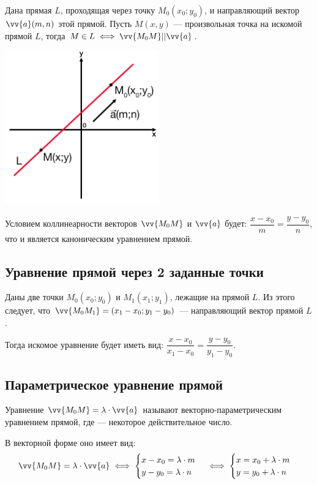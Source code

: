 \documentclass[a4paper,12pt]{extbook}
\theoremstyle{numbered}
\theoremstyle{named}
\theoremstyle{named}
\theoremstyle{named}
\begin{document}
Дана прямая \(L\), проходящая через точку \(M_0(x_0;y_0)\), и направляющий вектор \(\vv{a}(m, n)\) этой прямой.
Пусть \(M(x, y)\) — произвольная точка на искомой прямой \(L\), тогда \(M \in L \iff \vv{M_0M} || \vv{a}\).

\begin{center}
    \includegraphics[width=0.5\textwidth]{kanon_line.png}
\end{center}

Условием коллинеарности векторов \(\vv{M_0M}\) и \(\vv{a}\) будет:
\(\dfrac{x - x_0}{m} = \dfrac{y - y_0}{n}\), что и является каноническим уравнением прямой.

\subsection*{Уравнение прямой через 2 заданные точки}

Даны две точки \(M_0(x_0;y_0)\) и \(M_1(x_1;y_1)\), лежащие на прямой \(L\).
Из этого следует, что \(\vv{M_0M_1} = (x_1 - x_0; y_1 - y_0)\) — направляющий вектор прямой \(L\).

Тогда искомое уравнение будет иметь вид: \(\dfrac{x - x_0}{x_1 - x_0} = \dfrac{y - y_0}{y_1 - y_0}\).

\subsection*{Параметрическое уравнение прямой}

Уравнение \(\vv{M_0M} = \lambda \cdot \vv{a}\) называют векторно-параметрическим уравнением прямой, где \lambda — некоторое действительное число.

В векторной форме оно имеет вид:
\begin{gather*}
    \vv{M_0M} = \lambda \cdot \vv{a} \iff
    \begin{cases}
        x - x_0 = \lambda \cdot m \\
        y - y_0 = \lambda \cdot n
    \end{cases}
    \iff
    \begin{cases}
        x = x_0 + \lambda \cdot m \\
        y = y_0 + \lambda \cdot n
    \end{cases}
\end{gather*}
\end{document}
